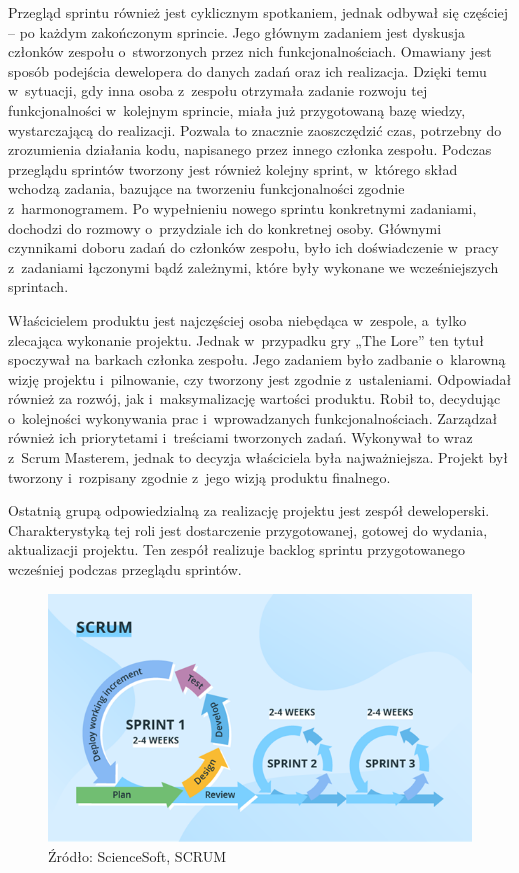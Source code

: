 \documentclass[oneside,polski,logo]{amuthesis}
\begin{document}
Przegląd sprintu również jest cyklicznym spotkaniem, jednak odbywał się częściej – po każdym zakończonym sprincie. Jego głównym zadaniem jest dyskusja członków zespołu o~stworzonych przez nich funkcjonalnościach. Omawiany jest sposób podejścia dewelopera do danych zadań oraz ich realizacja. Dzięki temu w~sytuacji, gdy inna osoba z~zespołu otrzymała zadanie rozwoju tej funkcjonalności w~kolejnym sprincie, miała już przygotowaną bazę wiedzy, wystarczającą do realizacji. Pozwala to znacznie zaoszczędzić czas, potrzebny do zrozumienia działania kodu, napisanego przez innego członka zespołu. Podczas przeglądu sprintów tworzony jest również kolejny sprint, w~którego skład wchodzą zadania, bazujące na tworzeniu funkcjonalności zgodnie z~harmonogramem. Po wypełnieniu nowego sprintu konkretnymi zadaniami, dochodzi do rozmowy o~przydziale ich do konkretnej osoby. Głównymi czynnikami doboru zadań do członków zespołu, było ich doświadczenie w~pracy z~zadaniami łączonymi bądź zależnymi, które były wykonane we wcześniejszych sprintach.

Właścicielem produktu jest najczęściej osoba niebędąca w~zespole, a~tylko zlecająca wykonanie projektu. Jednak w~przypadku gry „The Lore” ten tytuł spoczywał na barkach członka zespołu. Jego zadaniem było zadbanie o~klarowną wizję projektu i~pilnowanie, czy tworzony jest zgodnie z~ustaleniami. Odpowiadał również za rozwój, jak i~maksymalizację wartości produktu. Robił to, decydując o~kolejności wykonywania prac i~wprowadzanych funkcjonalnościach. Zarządzał również ich priorytetami i~treściami tworzonych zadań. Wykonywał to wraz z~Scrum Masterem, jednak to decyzja właściciela była najważniejsza. Projekt był tworzony i~rozpisany zgodnie z~jego wizją produktu finalnego.

Ostatnią grupą odpowiedzialną za realizację projektu jest zespół deweloperski. Charakterystyką tej roli jest dostarczenie przygotowanej, gotowej do wydania, aktualizacji projektu. Ten zespół realizuje backlog sprintu przygotowanego wcześniej podczas przeglądu sprintów.

\begin{figure}[h]
	\centering
	\includegraphics[width=13cm]{images/hyps/scrum.png}
	\caption{Źródło: ScienceSoft, SCRUM \cite{wykresy}} 
\end{figure}
\end{document}
